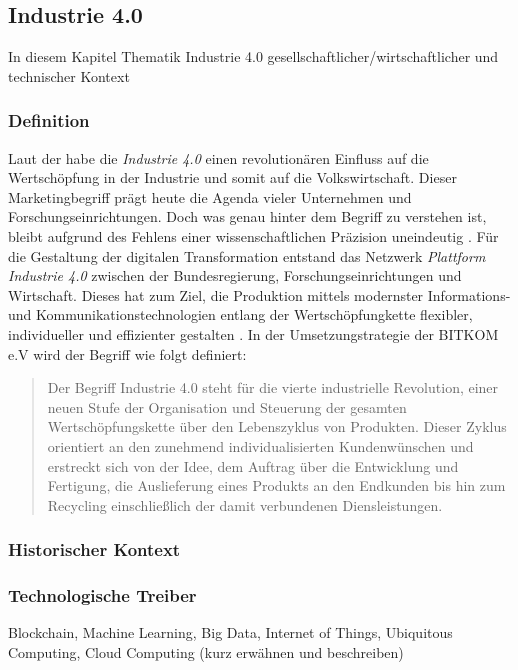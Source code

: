 \subsection{Industrie 4.0}
In diesem Kapitel Thematik Industrie 4.0 gesellschaftlicher/wirtschaftlicher und technischer Kontext
\subsubsection{Definition}

Laut der \cite{FraunhoferGesellschaft2016} habe die \textit{Industrie 4.0} einen revolutionären Einfluss auf die Wertschöpfung in der Industrie und somit auf die Volkswirtschaft. Dieser Marketingbegriff prägt heute die Agenda vieler Unternehmen und Forschungseinrichtungen. Doch was genau hinter dem Begriff zu verstehen ist, bleibt aufgrund des Fehlens einer  \glqq wissenschaftlichen Präzision\grqq{} uneindeutig \citep{Bendel2019}. Für die Gestaltung der digitalen Transformation entstand das Netzwerk \textit{Plattform Industrie 4.0} zwischen der Bundesregierung, Forschungseinrichtungen und Wirtschaft. Dieses hat zum Ziel, die Produktion mittels modernster Informations- und Kommunikationstechnologien entlang der Wertschöpfungkette \glqq flexibler, individueller und effizienter\grqq{} gestalten \citep{BWE2019}. In der Umsetzungstrategie der BITKOM e.V wird der Begriff wie folgt definiert:

\begin{quotation} \glqq Der Begriff Industrie 4.0 steht für die vierte industrielle Revolution, einer neuen Stufe der Organisation und Steuerung der gesamten Wertschöpfungskette über den Lebenszyklus von Produkten. Dieser Zyklus orientiert an den zunehmend individualisierten Kundenwünschen und erstreckt sich von der Idee, dem Auftrag über die Entwicklung und Fertigung, die Auslieferung eines Produkts an den Endkunden bis hin zum Recycling einschließlich der damit verbundenen Diensleistungen.\grqq{} \citep[S. 8]{BITKOM2015}
\end{quotation}

\subsubsection{Historischer Kontext}
\citep{Barthelmaes2017}

\subsubsection{Technologische Treiber}
Blockchain, Machine Learning, Big Data, Internet of Things, Ubiquitous Computing, Cloud Computing (kurz erwähnen und beschreiben)
